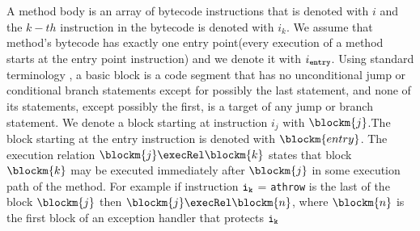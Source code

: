  A method body is an array of bytecode instructions that is denoted with $i$ and the $k-th$ instruction
 in the bytecode is  denoted with $i_{k}$.
 We assume that method's bytecode has exactly one entry point(every execution of a method starts at the entry point instruction) and we denote it with $i_{\tt{entry}}$.  Using standard terminology \cite{ARUCom1986}, a
basic block is a code segment that has no unconditional jump or
conditional branch statements except for possibly the last
statement, and none of its statements, except possibly the first,
is a target of any jump or branch statement. 
 We denote a block starting at instruction  $i_{j}$ with $\blockm{j}$.The block starting at the entry instruction is denoted with $\blockm{entry}$.
 The execution relation  $\blockm{j} \execRel \blockm{k}$  states that block $\blockm{k}$ may be executed immediately after $\blockm{j}$ in some execution path of the method. For example if  instruction $\tt{i_{k}}$ = \texttt{athrow} is the last of the block $\blockm{j}$ then 
$\blockm{j} \execRel \blockm{n}$, where  $\blockm{n}$ is the first block of an exception handler that protects $\tt{i_{k}}$ 

